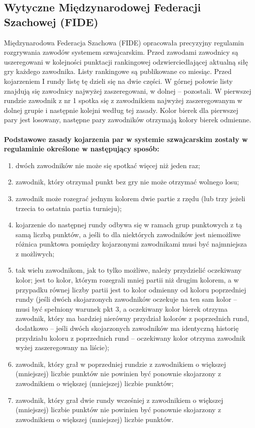 \subsection{Wytyczne Międzynarodowej Federacji Szachowej (FIDE)}
Międzynarodowa Federacja Szachowa (FIDE) opracowała precyzyjny regulamin rozgrywania zawodów systemem szwajcarskim. Przed zawodami zawodnicy są uszeregowani w kolejności punktacji rankingowej odzwierciedlającej aktualną siłę gry każdego zawodnika. Listy rankingowe są publikowane co miesiąc. Przed kojarzeniem I rundy listę tę dzieli się na dwie części. W górnej połowie listy znajdują się zawodnicy najwyżej zaszeregowani, w dolnej – pozostali. W pierwszej rundzie zawodnik z nr 1 spotka się z zawodnikiem najwyżej zaszeregowanym w dolnej grupie i następnie kolejni według tej zasady. Kolor bierek dla pierwszej pary jest losowany, następne pary zawodników otrzymają kolory bierek odmienne.\\\\
\textbf{Podstawowe zasady kojarzenia par w systemie szwajcarskim zostały w regulaminie określone w następujący sposób:}
\begin{enumerate}
\item dwóch zawodników nie może się spotkać więcej niż jeden raz;
\item zawodnik, który otrzymał punkt bez gry nie może otrzymać wolnego losu;
\item zawodnik może rozegrać jednym kolorem dwie partie z rzędu (lub trzy jeżeli trzecia to ostatnia partia turnieju);
\item kojarzenie do następnej rundy odbywa się w ramach grup punktowych z tą samą liczbą punktów, a jeśli to dla niektórych zawodników jest niemożliwe różnica punktowa pomiędzy kojarzonymi zawodnikami musi być najmniejsza z możliwych;
\item tak wielu zawodnikom, jak to tylko możliwe, należy przydzielić oczekiwany kolor; jest to kolor, którym rozegrali mniej partii niż drugim kolorem, a w przypadku równej liczby partii jest to kolor odmienny od koloru poprzedniej rundy (jeśli dwóch skojarzonych zawodników oczekuje na ten sam kolor – musi być spełniony warunek pkt 3, a oczekiwany kolor bierek otrzyma zawodnik, który ma bardziej nierówny przydział kolorów z poprzednich rund, dodatkowo – jeśli dwóch skojarzonych zawodników ma identyczną historię przydziału koloru z poprzednich rund – oczekiwany kolor otrzyma zawodnik wyżej zaszeregowany na liście);
\item zawodnik, który grał w poprzedniej rundzie z zawodnikiem o większej (mniejszej) liczbie punktów nie powinien być ponownie skojarzony z zawodnikiem o większej (mniejszej) liczbie punktów;
\item zawodnik, który grał dwie rundy wcześniej z zawodnikiem o większej (mniejszej) liczbie punktów nie powinien być ponownie skojarzony z zawodnikiem o większej (mniejszej) liczbie punktów.
\end{enumerate}
